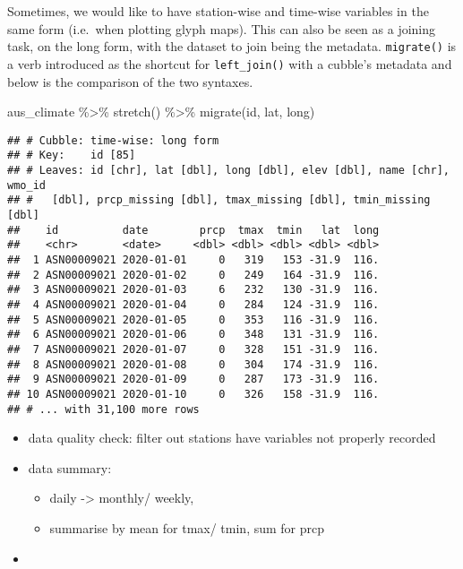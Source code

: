 \documentclass{article}
\newenvironment{Shaded}{\begin{snugshade}}{\end{snugshade}}
\newcommand{\FunctionTok}[1]{\textcolor[rgb]{0.00,0.00,0.00}{#1}}
\newcommand{\NormalTok}[1]{#1}
\newcommand{\SpecialCharTok}[1]{\textcolor[rgb]{0.00,0.00,0.00}{#1}}
\begin{document}
Sometimes, we would like to have station-wise and time-wise variables in
the same form (i.e.~when plotting glyph maps). This can also be seen as
a joining task, on the long form, with the dataset to join being the
metadata. \texttt{migrate()} is a verb introduced as the shortcut for
\texttt{left\_join()} with a cubble's metadata and below is the
comparison of the two syntaxes.

\begin{Shaded}
\begin{Highlighting}[]
\NormalTok{aus\_climate }\SpecialCharTok{\%\textgreater{}\%} 
  \FunctionTok{stretch}\NormalTok{() }\SpecialCharTok{\%\textgreater{}\%} 
  \FunctionTok{migrate}\NormalTok{(id, lat, long)}
\end{Highlighting}
\end{Shaded}

\begin{verbatim}
## # Cubble: time-wise: long form
## # Key:    id [85]
## # Leaves: id [chr], lat [dbl], long [dbl], elev [dbl], name [chr], wmo_id
## #   [dbl], prcp_missing [dbl], tmax_missing [dbl], tmin_missing [dbl]
##    id          date        prcp  tmax  tmin   lat  long
##    <chr>       <date>     <dbl> <dbl> <dbl> <dbl> <dbl>
##  1 ASN00009021 2020-01-01     0   319   153 -31.9  116.
##  2 ASN00009021 2020-01-02     0   249   164 -31.9  116.
##  3 ASN00009021 2020-01-03     6   232   130 -31.9  116.
##  4 ASN00009021 2020-01-04     0   284   124 -31.9  116.
##  5 ASN00009021 2020-01-05     0   353   116 -31.9  116.
##  6 ASN00009021 2020-01-06     0   348   131 -31.9  116.
##  7 ASN00009021 2020-01-07     0   328   151 -31.9  116.
##  8 ASN00009021 2020-01-08     0   304   174 -31.9  116.
##  9 ASN00009021 2020-01-09     0   287   173 -31.9  116.
## 10 ASN00009021 2020-01-10     0   326   158 -31.9  116.
## # ... with 31,100 more rows
\end{verbatim}

\begin{itemize}
\tightlist
\item
  data quality check: filter out stations have variables not properly
  recorded
\item
  data summary:

  \begin{itemize}
  \tightlist
  \item
    daily -\textgreater{} monthly/ weekly,
  \item
    summarise by mean for tmax/ tmin, sum for prcp
  \end{itemize}
\item
\end{itemize}
\end{document}
